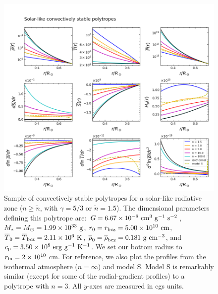 \documentclass[12pt]{article}
\numberwithin{equation}{section}
\begin{document}
  \begin{figure}
	\includegraphics[width=6.5in]{figures/solar_RZ_polytropes_stable.png}
	\caption{Sample of convectively stable polytropes for a solar-like radiative zone ($n\geq\tilde{n}$, with $\gamma=5/3$ or $\tilde{n}=1.5$). The dimensional parameters defining this polytrope are: $G=\sn{6.67}{-8}\ \cm^3\ \gram^{-1}\ \second^{-2}$, $M_*=M_\odot=1.99\times10^{33}\ {\rm{g}}$, $r_0=r_{\rm{bcz}}=5.00\times10^{10}\ {\rm{cm}}$, $\overline{T}_0=\overline{T}_{\rm{bcz}}=2.11\times10^{6}\ {\rm{K}}$,  $\rhoref_0=\rhoref\bcz=0.181\ \unitrho$, and $\cp=\sn{3.50}{8}\ \unitent$. We set our bottom radius to $r_{\rm{in}}=2\times10^{10}$ cm. For reference, we also plot the profiles from the isothermal atmosphere ($n=\infty$) and model S. Model S is remarkably similar (except for some of the radial-gradient profiles) to a polytrope with $n=3$. All $y$-axes are measured in cgs units.}
	\label{fig:RZ_polytrope_stable}
\end{figure}
\end{document}
